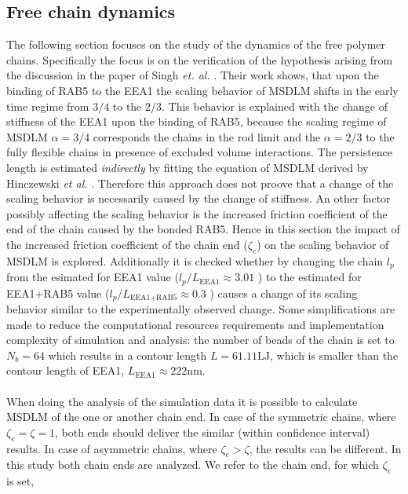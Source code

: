 \documentclass[
    paper=A4,pagesize=automedia,fontsize=12pt,
    BCOR=15mm,DIV=22,
    twoside,headinclude,footinclude=false,
    fleqn,             %
    bibliography=totocnumbered,          %
    listof=totoc,                %
    listof=flat,                 %
    cleardoublepage=empty      %
    numbers=endperiod
]{scrartcl}
\begin{document}
\subsection{Free chain dynamics}
The following section focuses on the study of the dynamics of the 
free polymer chains. Specifically the focus is on the verification
of the hypothesis arising from the discussion in the paper of 
Singh \emph{et. al.} \cite{Singh:2022}. Their work shows, that upon the 
binding of RAB5 to the EEA1 the scaling behavior of MSDLM shifts in 
the early time regime from $3/4$ to the $2/3$. This behavior is explained
with the change of stiffness of the EEA1 upon the binding of RAB5, because
the scaling regime of MSDLM $\alpha=3/4$ corresponds the chains in the rod limit
and the $\alpha=2/3$ to the fully flexible chains in presence of excluded
volume interactions. The persistence length is estimated \emph{indirectly} by 
fitting the equation of MSDLM \cite{Singh:2022} derived by 
Hinczewski \emph{et al.} \cite{Hinczewski_2009}. Therefore this approach does
not proove that a change of the scaling behavior is necessarily caused by the change
of stiffness. An other factor possibly affecting the scaling behavior
is the increased friction coefficient of the end of the chain caused by the
bonded RAB5. Hence in this section the impact of the increased friction 
coefficient of the chain end ($\zeta_e$) on the scaling behavior of MSDLM is explored.
Additionally it is checked whether by changing the chain $l_p$ from the 
esimated for EEA1 value ($l_p/L_{\text{EEA1}} \approx 3.01$ \cite{Singh:2022}) to
the estimated for EEA1+RAB5 value 
($l_p/L_{\text{EEA1+RAB5}} \approx 0.3$ \cite{Singh:2022}) causes a change of its 
scaling behavior similar to the experimentally observed change.
Some simplifications are made to reduce the computational resources
requirements and implementation complexity of simulation and analysis:
the number of beads of the chain is set to $N_b=64$ which results in a
contour length $L=61.11\text{LJ}$, which is smaller than the contour length of EEA1,
$L_{\text{EEA1}}\approx222\text{nm}$.
\\
\\
When doing the analysis of the simulation data it is possible to 
calculate MSDLM of the one or another
chain end. In case of the symmetric chains, where $\zeta_e=\zeta=1$, both ends should 
deliver the similar (within confidence interval) results. In case of asymmetric chains,
where $\zeta_e > \zeta$, the results can be different. In this study
both chain ends are analyzed. We refer to the chain end, for which $\zeta_e$ is set,
\end{document}
